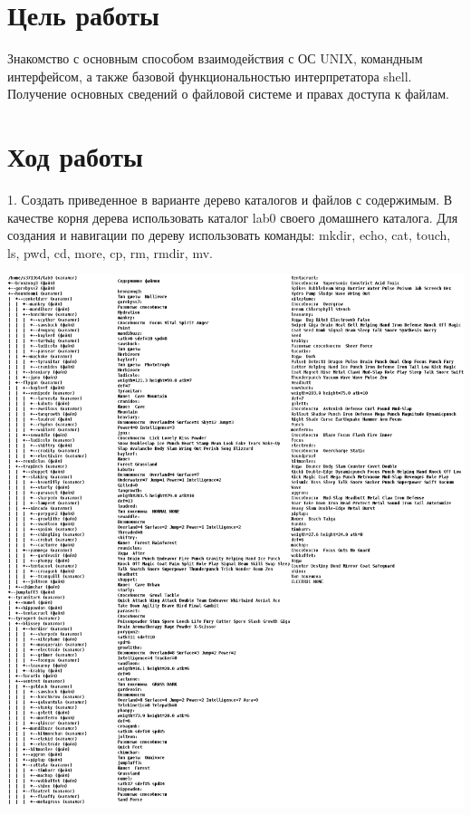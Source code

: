\documentclass{article}
\begin{document}

\section*{Цель работы}
Знакомство с основным способом взаимодействия с ОС UNIX,
командным интерфейсом, а также базовой функциональностью
интерпретатора shell. Получение основных сведений о файловой
системе и правах доступа к файлам.

\section*{Ход работы}


1. Создать приведенное в варианте дерево каталогов и файлов с содержимым. В качестве корня дерева использовать каталог lab0 своего домашнего каталога. Для создания и навигации по дереву использовать команды: mkdir, echo, cat, touch, ls, pwd, cd, more, cp, rm, rmdir, mv.

\vspace*{\fill}
\includegraphics[width=\textwidth]{files.png}
\end{document}
